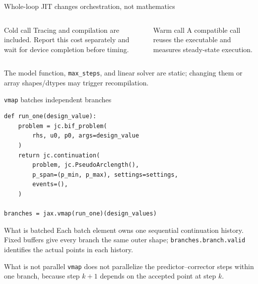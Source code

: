 \begin{frame}{Whole-loop JIT changes orchestration, not mathematics}
\centering
{}
\vspace{4mm}
\begin{columns}[T]
\begin{alertblock}{Cold call}
Tracing and compilation are included. Report this cost separately and wait for
device completion before timing.
\end{alertblock}
\begin{block}{Warm call}
A compatible call reuses the executable and measures steady-state execution.
\end{block}
\end{columns}
\vspace{2mm}
{\small The model function, \texttt{max\_steps}, and linear solver are static;
changing them or array shapes/dtypes may trigger recompilation.}
\end{frame}

\begin{frame}[fragile]{\texttt{vmap} batches independent branches}
\begin{lstlisting}
def run_one(design_value):
    problem = jc.bif_problem(
        rhs, u0, p0, args=design_value
    )
    return jc.continuation(
        problem, jc.PseudoArclength(),
        p_span=(p_min, p_max), settings=settings,
        events=(),
    )

branches = jax.vmap(run_one)(design_values)
\end{lstlisting}
\begin{block}{What is batched}
Each batch element owns one sequential continuation history. Fixed buffers give
every branch the same outer shape; \texttt{branches.branch.valid} identifies
the actual points in each history.
\end{block}
\begin{alertblock}{What is not parallel}
\texttt{vmap} does not parallelize the predictor--corrector steps within one
branch, because step $k+1$ depends on the accepted point at step $k$.
\end{alertblock}
\end{frame}

